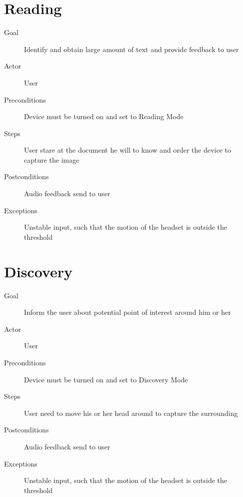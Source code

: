 \section{Reading}
\begin{description}
\item [Goal] Identify and obtain large amount of text and provide feedback to user
\item [Actor] User
\item [Preconditions] Device must be turned on and set to Reading Mode
\item [Steps] User stare at the document he will to know and order the device to capture the image
\item [Postconditions] Audio feedback send to user
\item [Exceptions] Unstable input, such that the motion of the headset is outside the threshold
\end{description}


\vspace{5mm}


\section{Discovery}
\begin{description}
\item [Goal] Inform the user about potential point of interest around him or her
\item [Actor] User
\item [Preconditions] Device must be turned on and set to Discovery Mode
\item [Steps] User need to move his or her head around to capture the surrounding
\item [Postconditions] Audio feedback send to user
\item [Exceptions] Unstable input, such that the motion of the headset is outside the threshold
\end{description}